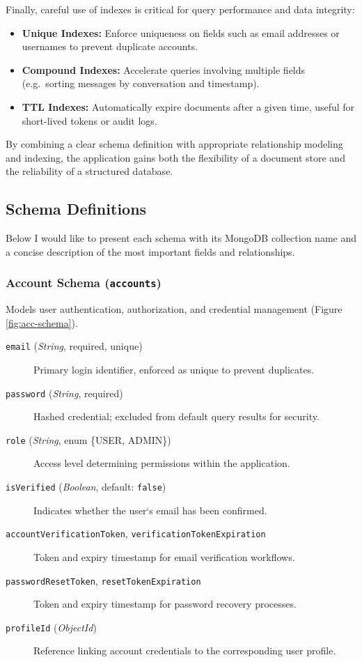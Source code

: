 Finally, careful use of indexes is critical for query performance and data integrity:
\begin{itemize}
  \item \textbf{Unique Indexes:}  Enforce uniqueness on fields such as email addresses or usernames to prevent duplicate accounts.
  \item \textbf{Compound Indexes:}  Accelerate queries involving multiple fields (e.g.\ sorting messages by conversation and timestamp).
  \item \textbf{TTL Indexes:}  Automatically expire documents after a given time, useful for short-lived tokens or audit logs.
\end{itemize}

By combining a clear schema definition with appropriate relationship modeling and indexing, the application gains both the flexibility of a document store and the reliability of a structured database. 

\subsection{Schema Definitions}

Below I would like to present each schema with its MongoDB collection name and a concise description of the most important fields and relationships.

\subsubsection{Account Schema (\texttt{accounts})}
Models user authentication, authorization, and credential management (Figure \ref{fig:acc-schema}).
\begin{description}
  \item[\texttt{email} (\emph{String}, required, unique)]  
    Primary login identifier, enforced as unique to prevent duplicates.
  \item[\texttt{password} (\emph{String}, required)]  
    Hashed credential; excluded from default query results for security.
  \item[\texttt{role} (\emph{String}, enum \{USER, ADMIN\})]  
    Access level determining permissions within the application.
  \item[\texttt{isVerified} (\emph{Boolean}, default: \texttt{false})]  
    Indicates whether the user`s email has been confirmed.
  \item[\texttt{accountVerificationToken}, \texttt{verificationTokenExpiration}]  
    Token and expiry timestamp for email verification workflows.
  \item[\texttt{passwordResetToken}, \texttt{resetTokenExpiration}]  
    Token and expiry timestamp for password recovery processes.
  \item[\texttt{profileId} (\emph{ObjectId})]  
    Reference linking account credentials to the corresponding user profile.
\end{description}

